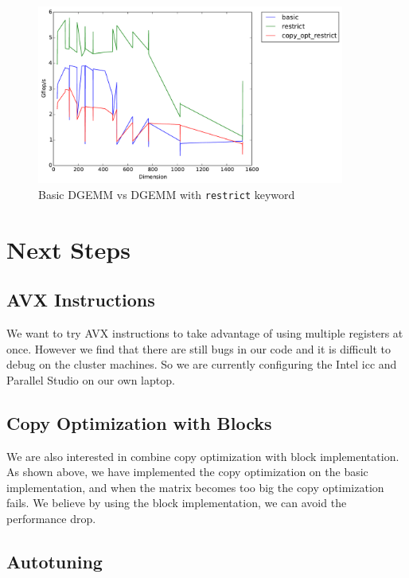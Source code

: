 \documentclass[11pt]{article}
\theoremstyle{plain}
\theoremstyle{definition}
\begin{document}
\begin{figure}[H]
    \includegraphics[width=0.9\textwidth]{timing_copy_opt_restrict.pdf}
    \caption{Basic DGEMM vs DGEMM with \texttt{restrict} keyword}
    \label{restrict_copy_opt}
\end{figure} 
\section{Next Steps}

\subsection{AVX Instructions}
We want to try AVX instructions to take advantage of using multiple registers at once. However we find that there are still bugs in our code and it is difficult to debug on the cluster machines. So we are currently configuring the Intel icc and Parallel Studio on our own laptop.

\subsection{Copy Optimization with Blocks}
We are also interested in combine copy optimization with block implementation. As shown above, we have implemented the copy optimization on the basic implementation, and when the matrix becomes too big the copy optimization fails. We believe by using the block implementation, we can avoid the performance drop.

\subsection{Autotuning}





 
 
\end{document}
